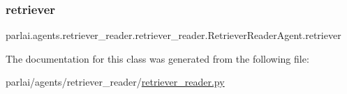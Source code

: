 \subsubsection{\texorpdfstring{retriever}{retriever}}
{\footnotesize\ttfamily parlai.\+agents.\+retriever\+\_\+reader.\+retriever\+\_\+reader.\+Retriever\+Reader\+Agent.\+retriever}



The documentation for this class was generated from the following file\+:\begin{DoxyCompactItemize}
\item 
parlai/agents/retriever\+\_\+reader/\hyperlink{retriever__reader_8py}{retriever\+\_\+reader.\+py}\end{DoxyCompactItemize}
